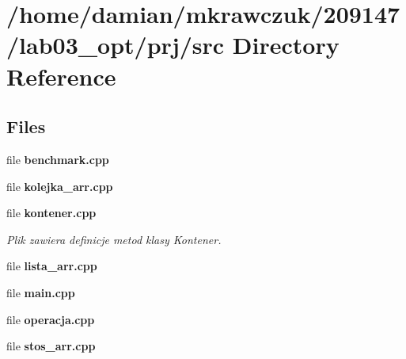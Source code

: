 \section{/home/damian/mkrawczuk/209147/lab03\-\_\-opt/prj/src Directory Reference}
\label{dir_400757c3a0df52e783ed9699284f29ce}
\subsection*{Files}
\begin{DoxyCompactItemize}
\item 
file {\bf benchmark.\-cpp}
\item 
file {\bf kolejka\-\_\-arr.\-cpp}
\item 
file {\bf kontener.\-cpp}
\begin{DoxyCompactList}\small\item\em Plik zawiera definicje metod klasy Kontener. \end{DoxyCompactList}\item 
file {\bf lista\-\_\-arr.\-cpp}
\item 
file {\bf main.\-cpp}
\item 
file {\bf operacja.\-cpp}
\item 
file {\bf stos\-\_\-arr.\-cpp}
\end{DoxyCompactItemize}
